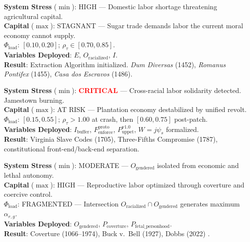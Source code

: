 \begin{tcolorbox}[colback=black!5, colframe=black!70, fonttitle=\bfseries\ttfamily, title=1. RUNTIME LOG: 1486 (LISBON{,} PORTUGAL) \normalfont\small--- Chapter \ref{ch:portugal}]
\ttfamily\small
\textbf{System Stress} ($\min$): HIGH --- Domestic labor shortage threatening agricultural capital.\\
\textbf{Capital} ($\max$): STAGNANT --- Sugar trade demands labor the current moral economy cannot supply.\\
\textbf{$\Phi_{\text{load}}$}: $[0.10, 0.20]$; $\rho_{\tau} \in [0.70, 0.85]$.\\
\textbf{Variables Deployed}: $E$, $O_{\text{racialized}}$, $I$.\\
\textbf{Result}: Extraction Algorithm initialized. \textit{Dum Diversas} (1452), \textit{Romanus Pontifex} (1455), \textit{Casa dos Escravos} (1486).
\end{tcolorbox}

\begin{tcolorbox}[colback=black!5, colframe=black!70, fonttitle=\bfseries\ttfamily, title=2. RUNTIME LOG: 1676--1787 (VIRGINIA $\rightarrow$ PHILADELPHIA) \normalfont\small--- Chapter \ref{ch:bacon}]
\ttfamily\small
\textbf{System Stress} ($\min$): \textcolor{red}{\textbf{CRITICAL}} --- Cross-racial labor solidarity detected. Jamestown burning.\\
\textbf{Capital} ($\max$): AT RISK --- Plantation economy destabilized by unified revolt.\\
\textbf{$\Phi_{\text{load}}$}: $[0.15, 0.55]$; $\rho_{\tau}>1.00$ at crash, then $[0.60, 0.75]$ post-patch.\\
\textbf{Variables Deployed}: $I_{\text{buffer}}$, $F_{\text{enforce}}^{\text{proto}}$, $P_{\text{uppet}}^{\text{v1.0}}$, $W = j\psi_s$ formalized.\\
\textbf{Result}: Virginia Slave Codes (1705), Three-Fifths Compromise (1787), constitutional front-end/back-end separation.
\end{tcolorbox}

\begin{tcolorbox}[colback=black!5, colframe=black!70, fonttitle=\bfseries\ttfamily, title=3. RUNTIME LOG: GENDERED AXIS (FOUNDATIONAL--PRESENT) \normalfont\small--- Chapter \ref{ch:gendered}]
\ttfamily\small
\textbf{System Stress} ($\min$): MODERATE --- $O_{\text{gendered}}$ isolated from economic and lethal autonomy.\\
\textbf{Capital} ($\max$): HIGH --- Reproductive labor optimized through coverture and coercive control.\\
\textbf{$\Phi_{\text{load}}$}: FRAGMENTED --- Intersection $O_{\text{racialized}} \cap O_{\text{gendered}}$ generates maximum $\alpha_{r,g}$.\\
\textbf{Variables Deployed}: $O_{\text{gendered}}$, $P_{\text{coverture}}$, $P_{\text{fetal\_personhood}}$.\\
\textbf{Result}: Coverture (1066--1974), Buck v.\ Bell (1927), Dobbs (2022) \cite{dobbs}.
\end{tcolorbox}

